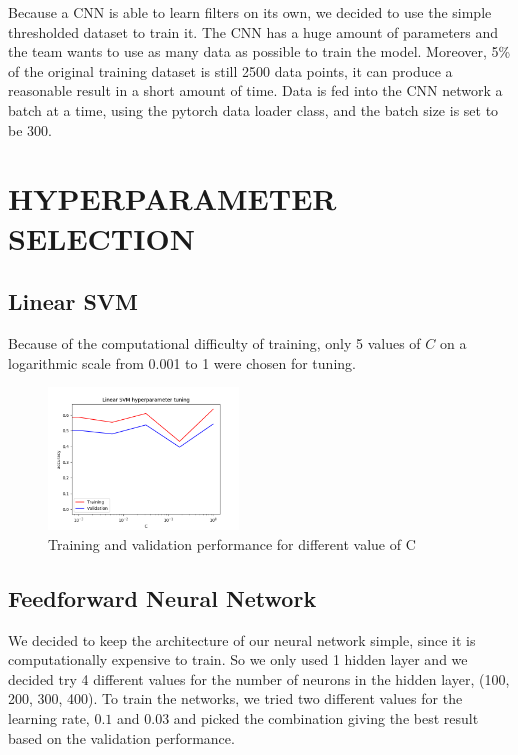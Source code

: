 \documentclass[letterpaper, 10 pt, conference]{ieeeconf}  %
\begin{document}
Because a CNN is able to learn filters on its own, we decided to use the simple thresholded dataset to train it. The CNN has a huge amount of parameters and the team wants to use as many data as possible to train the model. Moreover, 5\% of the original training dataset is still 2500 data points, it can produce a reasonable result in a short amount of time. 
Data is fed into the CNN network a batch at a time, using the pytorch data loader class, and the batch size is set to be 300.


\section{HYPERPARAMETER SELECTION}\label{sec:hyperParams}
\subsection{Linear SVM}
Because of the computational difficulty of training, only 5 values of $C$ on a logarithmic scale from 0.001 to 1 were chosen for tuning. 
\begin{figure}
	\begin{center}
		\includegraphics[width=0.45\textwidth]{figures/svm_tuning.png}  %
		\caption{Training and validation performance for different value of C}
		\label{fig:svmtuning}
	\end{center}
\end{figure}

\subsection{Feedforward Neural Network}
We decided to keep the architecture of our neural network simple, since it is computationally expensive to train. So we only used 1 hidden layer and we decided try 4 different values for the number of neurons in the hidden layer, (100, 200, 300, 400).
To train the networks, we tried two different values for the learning rate, $0.1$ and $0.03$ and picked the combination giving the best result based on the validation performance.
\end{document}
